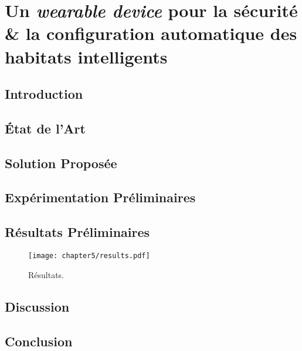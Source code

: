 \chapter{Un \textit{wearable device} pour la sécurité \& la configuration automatique des habitats intelligents}
\label{chap:5}

\section{Introduction}

\section{État de l'Art}

\section{Solution Proposée}

\section{Expérimentation Préliminaires}

\section{Résultats Préliminaires}

\begin{figure}[H]
	\centering
	\texttt{[image: chapter5/results.pdf]}
        \caption{Résultats.}
	\label{fig:chap5-results}
\end{figure}

\section{Discussion}

\section{Conclusion}
